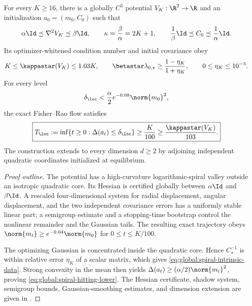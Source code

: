 \begin{theorem}
\label{thm:global:spiral-lower}
For every \(K\geq16\), there is a globally \(C^3\) potential \(V_K:\R^2\to\R\) and an
initialization \(a_0=(m_0,C_0)\) such that
\begin{equation}
\label{eq:global:spiral-curvature}
    \alpha\Id\preceq\nabla^2V_K\preceq\beta\Id,
    \qquad
    \kappa=\frac\beta\alpha=2K+1,
    \qquad
    \frac1\beta\Id\preceq C_0\preceq\frac1\alpha\Id.
\end{equation}
Its optimizer-whitened condition number and initial covariance obey
\begin{equation}
\label{eq:global:spiral-intrinsic-data}
    K\leq\kappastar(V_K)\leq1.03K,
    \qquad
    \betastar\lambda_{0,\star}
    \geq\frac{1-\eta_K}{1+\eta_K},
    \qquad
    0\leq\eta_K\leq10^{-3}.
\end{equation}
For every level
\begin{equation}
\label{eq:global:spiral-local-level}
    \delta_{\loc}<\frac\alpha2e^{-0.08}\norm{m_0}^2,
\end{equation}
the exact Fisher--Rao flow satisfies
\begin{equation}
\label{eq:global:spiral-hitting-lower}
    \boxed{
    T_{\loc}:=\inf\{t\geq0:\Delta(a_t)\leq\delta_{\loc}\}
    \geq\frac K{100}
    \geq\frac{\kappastar(V_K)}{103}.}
\end{equation}
The construction extends to every dimension \(d\geq2\) by adjoining independent
quadratic coordinates initialized at equilibrium.
\end{theorem}

\begin{proof}[Proof outline]
The potential has a high-curvature logarithmic-spiral valley outside an isotropic quadratic core.
Its Hessian is certified globally between \(\alpha\Id\) and \(\beta\Id\).  A rescaled
four-dimensional system for radial displacement, angular displacement, and the two independent
covariance errors has a uniformly stable linear part; a semigroup estimate and a stopping-time
bootstrap control the nonlinear remainder and the Gaussian tails.  The resulting exact trajectory
obeys
\(
\norm{m_t}\geq e^{-0.04}\norm{m_0}
\) for \(0\leq t\leq K/100\).

The optimizing Gaussian is concentrated inside the quadratic core.  Hence
\(C_\star^{-1}\) is within relative error \(\eta_K\) of a scalar matrix, which gives
\eqref{eq:global:spiral-intrinsic-data}.  Strong convexity in the mean then yields
\(
\Delta(a_t)\geq(\alpha/2)\norm{m_t}^2
\), proving \eqref{eq:global:spiral-hitting-lower}.  The Hessian certificate, shadow system,
semigroup bounds, Gaussian-smoothing estimates, and dimension extension are given in
.
\end{proof}

